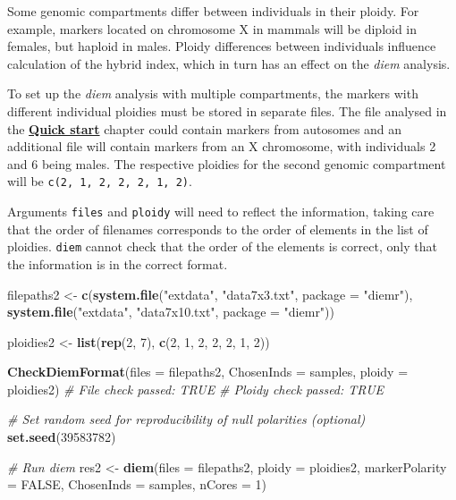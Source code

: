 \documentclass[
]{book}
\newenvironment{Shaded}{\begin{snugshade}}{\end{snugshade}}
\newcommand{\AttributeTok}[1]{\textcolor[rgb]{0.13,0.29,0.53}{#1}}
\newcommand{\CommentTok}[1]{\textcolor[rgb]{0.56,0.35,0.01}{\textit{#1}}}
\newcommand{\ConstantTok}[1]{\textcolor[rgb]{0.56,0.35,0.01}{#1}}
\newcommand{\DecValTok}[1]{\textcolor[rgb]{0.00,0.00,0.81}{#1}}
\newcommand{\FunctionTok}[1]{\textcolor[rgb]{0.13,0.29,0.53}{\textbf{#1}}}
\newcommand{\NormalTok}[1]{#1}
\newcommand{\OtherTok}[1]{\textcolor[rgb]{0.56,0.35,0.01}{#1}}
\newcommand{\StringTok}[1]{\textcolor[rgb]{0.31,0.60,0.02}{#1}}
\begin{document}
Some genomic compartments differ between individuals in their ploidy. For example, markers located on
chromosome X in mammals will be diploid in females, but haploid in males. Ploidy differences between
individuals influence calculation of the hybrid index, which in turn has an effect on the \emph{diem} analysis.

To set up the \emph{diem} analysis with multiple compartments, the markers with different individual ploidies
must be stored in separate files. The file analysed in the \hyperref[intro]{\textbf{Quick start}} chapter could contain
markers from autosomes and an additional file will contain markers from an X
chromosome, with individuals 2 and 6 being males. The respective ploidies for the second genomic
compartment
will be \texttt{c(2,\ 1,\ 2,\ 2,\ 2,\ 1,\ 2)}.

Arguments \texttt{files} and \texttt{ploidy} will need to reflect the information, taking care that the order of filenames
corresponds to the order of elements in the list of ploidies. \texttt{diem} cannot check that the order of the
elements
is correct, only that the information is in the correct format.

\begin{Shaded}
\begin{Highlighting}[]
\NormalTok{filepaths2 }\OtherTok{\textless{}{-}} \FunctionTok{c}\NormalTok{(}\FunctionTok{system.file}\NormalTok{(}\StringTok{"extdata"}\NormalTok{, }\StringTok{"data7x3.txt"}\NormalTok{, }\AttributeTok{package =} \StringTok{"diemr"}\NormalTok{),}
                \FunctionTok{system.file}\NormalTok{(}\StringTok{"extdata"}\NormalTok{, }\StringTok{"data7x10.txt"}\NormalTok{, }\AttributeTok{package =} \StringTok{"diemr"}\NormalTok{))}
               
\NormalTok{ploidies2 }\OtherTok{\textless{}{-}} \FunctionTok{list}\NormalTok{(}\FunctionTok{rep}\NormalTok{(}\DecValTok{2}\NormalTok{, }\DecValTok{7}\NormalTok{),}
                  \FunctionTok{c}\NormalTok{(}\DecValTok{2}\NormalTok{, }\DecValTok{1}\NormalTok{, }\DecValTok{2}\NormalTok{, }\DecValTok{2}\NormalTok{, }\DecValTok{2}\NormalTok{, }\DecValTok{1}\NormalTok{, }\DecValTok{2}\NormalTok{))}

\FunctionTok{CheckDiemFormat}\NormalTok{(}\AttributeTok{files =}\NormalTok{ filepaths2, }
                \AttributeTok{ChosenInds =}\NormalTok{ samples,}
                \AttributeTok{ploidy =}\NormalTok{ ploidies2)}
\CommentTok{\# File check passed: TRUE}
\CommentTok{\# Ploidy check passed: TRUE}

\CommentTok{\# Set random seed for reproducibility of null polarities (optional)}
\FunctionTok{set.seed}\NormalTok{(}\DecValTok{39583782}\NormalTok{)}

\CommentTok{\# Run diem }
\NormalTok{res2 }\OtherTok{\textless{}{-}} \FunctionTok{diem}\NormalTok{(}\AttributeTok{files =}\NormalTok{ filepaths2, }
             \AttributeTok{ploidy =}\NormalTok{ ploidies2, }
             \AttributeTok{markerPolarity =} \ConstantTok{FALSE}\NormalTok{,}
             \AttributeTok{ChosenInds =}\NormalTok{ samples, }
             \AttributeTok{nCores =} \DecValTok{1}\NormalTok{)}
\end{Highlighting}
\end{Shaded}
\end{document}

